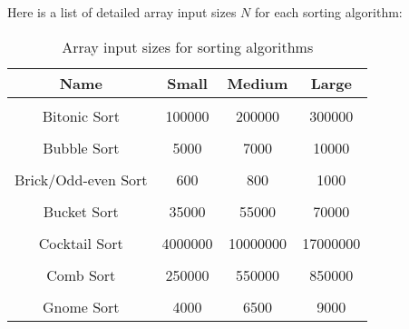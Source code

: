 Here is a list of detailed array input sizes \(N\) for each sorting algorithm:
\begin{table}[h!]
\centering
\begin{tabular}{||c c c c||} 
\hline
Name & Small & Medium & Large \\ [1ex] 
\hline\hline
 & & & \\
Bitonic Sort & 100000 & 200000 & 300000 \\ 
 & & & \\
Bubble Sort & 5000 & 7000 & 10000 \\ 
 & & & \\
Brick/Odd-even Sort & 600 & 800 & 1000 \\ 
 & & & \\
Bucket Sort & 35000 & 55000 & 70000 \\ 
 & & & \\
Cocktail Sort & 4000000 & 10000000 & 17000000 \\ 
 & & & \\
Comb Sort & 250000 & 550000 & 850000 \\ 
 & & & \\
Gnome Sort & 4000 & 6500 & 9000 \\ [1ex]
\hline
\end{tabular}
\caption{Array input sizes for sorting algorithms}
\label{table:time_complexity_1}
\end{table}

